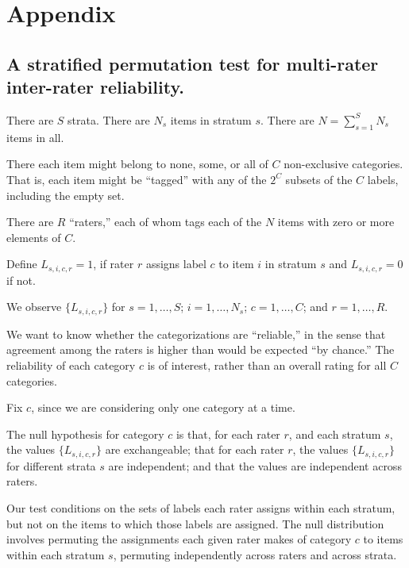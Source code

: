 \documentclass[]{article}
\begin{document}



\pagebreak

\section*{Appendix}

\subsection*{A stratified permutation test for multi-rater inter-rater reliability.}

There are $S$ strata.
There are $N_s$ items in stratum $s$.
There are $N = \sum_{s=1}^S N_s$ items in all.

There each item might belong to none, some, or all of $C$ non-exclusive categories.
That is, each item might be ``tagged'' with any of the $2^C$ subsets
of the $C$ labels, including the empty set.

There are $R$ ``raters,'' each of whom tags each of the $N$ items with zero
or more elements of $C$.

Define $L_{s,i,c,r} = 1$, if rater $r$ assigns label $c$ to item $i$ in stratum
$s$ and $L_{s,i,c,r} = 0$ if not.

We observe $\{ L_{s,i,c,r} \}$ for $s=1, \dots, S$;  $i=1, \dots, N_s$;
$c=1, \dots, C$; and $r=1, \dots, R$.

We want to know whether the categorizations are ``reliable,'' in the sense that
agreement among the raters is higher than would be expected ``by chance.''
The reliability of each category $c$ is of interest, rather than an overall
rating for all $C$ categories.

Fix $c$, since we are considering only one category at a time.

The null hypothesis for category $c$ is that, for each rater $r$, and each
stratum $s$, the values $\{ L_{s,i,c,r} \}$ are exchangeable; that for each
rater $r$, the values $\{ L_{s,i,c,r} \}$ for different strata $s$ are
independent; and that the values are independent across raters.

Our test conditions on the sets of labels each rater assigns within each
stratum, but not on the items to which those labels are assigned.
The null distribution involves permuting the assignments each given rater makes
of category $c$ to items within each stratum $s$, permuting independently
across raters and across strata.
\end{document}
